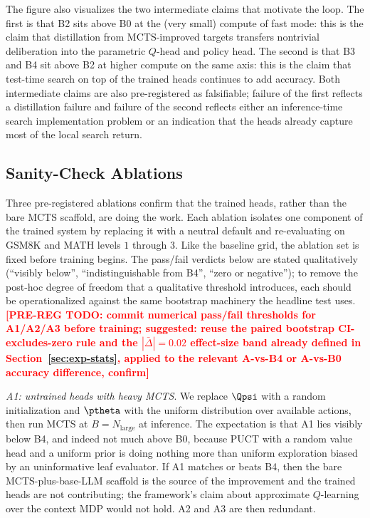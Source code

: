 The figure also visualizes the two intermediate claims that motivate
the loop. The first is that B2 sits above B0 at the (very small)
compute of fast mode: this is the claim that distillation from
MCTS-improved targets transfers nontrivial deliberation into the
parametric $Q$-head and policy head. The second is that B3 and B4 sit
above B2 at higher compute on the same axis: this is the claim that
test-time search on top of the trained heads continues to add
accuracy. Both intermediate claims are also pre-registered as
falsifiable; failure of the first reflects a distillation failure and
failure of the second reflects either an inference-time search
implementation problem or an indication that the heads already capture
most of the local search return.

\subsection{Sanity-Check Ablations}
\label{sec:exp-ablations}

Three pre-registered ablations confirm that the trained heads, rather
than the bare MCTS scaffold, are doing the work. Each ablation
isolates one component of the trained system by replacing it with a
neutral default and re-evaluating on GSM8K and MATH levels $1$ through
$3$. Like the baseline grid, the ablation set is fixed before training
begins. The pass/fail verdicts below are stated qualitatively
(``visibly below'', ``indistinguishable from B4'', ``zero or
negative''); to remove the post-hoc degree of freedom that a qualitative
threshold introduces, each should be operationalized against the same
bootstrap machinery the headline test uses.
\textcolor{red}{\textbf{[PRE-REG TODO: commit numerical pass/fail
thresholds for A1/A2/A3 before training; suggested: reuse the paired
bootstrap CI-excludes-zero rule and the $|\bar{\Delta}| = 0.02$
effect-size band already defined in Section~\ref{sec:exp-stats}, applied
to the relevant A-vs-B4 or A-vs-B0 accuracy difference, confirm]}}

\textit{A1: untrained heads with heavy MCTS}. We replace $\Qpsi$ with a
random initialization and $\ptheta$ with the uniform distribution over
available actions, then run MCTS at $B = N_{\mathrm{large}}$ at
inference. The expectation is that A1 lies visibly below B4, and indeed
not much above B0, because PUCT with a random value head and a uniform
prior is doing nothing more than uniform exploration biased by an
uninformative leaf evaluator. If A1 matches or beats B4, then the bare
MCTS-plus-base-LLM scaffold is the source of the improvement and the
trained heads are not contributing; the framework's claim about
approximate $Q$-learning over the context MDP would not hold. A2 and
A3 are then redundant.

